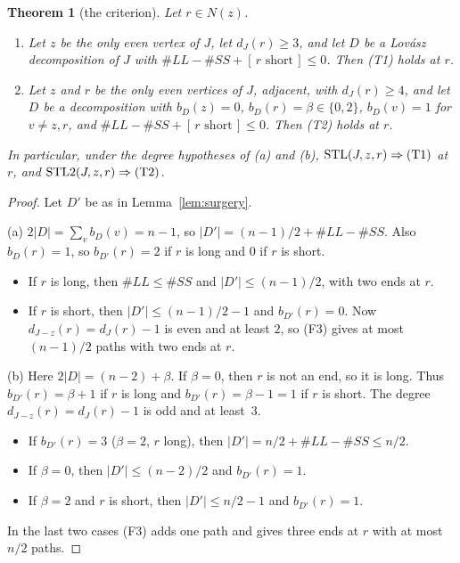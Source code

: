 \documentclass[11pt]{amsart}
\newtheorem{theorem}{Theorem}[section]
\theoremstyle{definition}
\newcommand{\ind}[1]{[\,#1\,]}
\newcommand{\lean}[1]{\quad{\footnotesize[Lean: \texttt{#1}]}}
\newcommand{\STL}{\mathrm{STL}}
\begin{document}
\begin{theorem}[the criterion]\label{thm:criterion}
Let $r\in N(z)$.
\begin{enumerate}[label=\textup{(\alph*)}]
\item Let $z$ be the only even vertex of $J$, let $d_J(r)\ge3$, and let $D$ be a Lov\'asz
decomposition of $J$ with $\#LL-\#SS+\ind{r\text{ short}}\le0$. Then \textup{(T1)} holds at $r$.
\item Let $z$ and $r$ be the only even vertices of $J$, adjacent, with $d_J(r)\ge4$, and let $D$
be a decomposition with $b_D(z)=0$, $b_D(r)=\beta\in\{0,2\}$, $b_D(v)=1$ for $v\ne z,r$, and
$\#LL-\#SS+\ind{r\text{ short}}\le0$. Then \textup{(T2)} holds at $r$.
\end{enumerate}
In particular, under the degree hypotheses of \textup{(a)} and \textup{(b)},
$\STL(J,z,r)\Rightarrow\textup{(T1)}$ at $r$, and
$\STL2(J,z,r)\Rightarrow\textup{(T2)}$.
\lean{test1\_of\_stl, test2\_of\_stl2}
\end{theorem}

\begin{proof}
Let $D'$ be as in Lemma~\ref{lem:surgery}.

(a) $2|D|=\sum_vb_D(v)=n-1$, so $|D'|=(n-1)/2+\#LL-\#SS$. Also $b_D(r)=1$, so $b_{D'}(r)=2$ if $r$
is long and $0$ if $r$ is short.
\begin{itemize}
\item If $r$ is long, then $\#LL\le\#SS$ and $|D'|\le(n-1)/2$, with two ends at $r$.
\item If $r$ is short, then $|D'|\le(n-1)/2-1$ and $b_{D'}(r)=0$. Now $d_{J-z}(r)=d_J(r)-1$ is even
and at least $2$, so (F3) gives at most $(n-1)/2$ paths with two ends at $r$.
\end{itemize}

(b) Here $2|D|=(n-2)+\beta$. If $\beta=0$, then $r$ is not an end, so it is long. Thus
$b_{D'}(r)=\beta+1$ if $r$ is long and $b_{D'}(r)=\beta-1=1$ if $r$ is short. The degree
$d_{J-z}(r)=d_J(r)-1$ is odd and at least~$3$.
\begin{itemize}
\item If $b_{D'}(r)=3$ ($\beta=2$, $r$ long), then $|D'|=n/2+\#LL-\#SS\le n/2$.
\item If $\beta=0$, then $|D'|\le(n-2)/2$ and $b_{D'}(r)=1$.
\item If $\beta=2$ and $r$ is short, then $|D'|\le n/2-1$ and $b_{D'}(r)=1$.
\end{itemize}
In the last two cases (F3) adds one path and gives three ends at $r$ with at most $n/2$ paths.
\end{proof}
\end{document}
